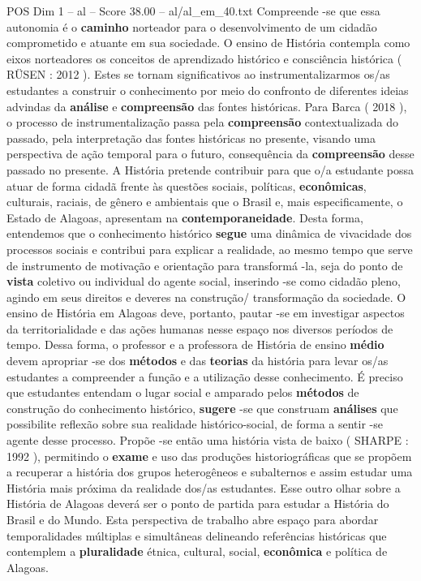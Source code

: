 \begin{textsample}{POS Dim 1 – al – Score 38.00 – al/al\_em\_40.txt}
Compreende -se que essa autonomia é o \textbf{caminho} norteador para o desenvolvimento de um cidadão comprometido e atuante em sua sociedade.
O ensino de História contempla como eixos norteadores os conceitos de aprendizado histórico e consciência histórica ( RÜSEN : 2012 ).
Estes se tornam significativos ao instrumentalizarmos os/as estudantes a construir o conhecimento por meio do confronto de diferentes ideias advindas da \textbf{análise} e \textbf{compreensão} das fontes históricas.
Para Barca ( 2018 ), o processo de instrumentalização passa pela \textbf{compreensão} contextualizada do passado, pela interpretação das fontes históricas no presente, visando uma perspectiva de ação temporal para o futuro, consequência da \textbf{compreensão} desse passado no presente.
A História pretende contribuir para que o/a estudante possa atuar de forma cidadã frente às questões sociais, políticas, \textbf{econômicas}, culturais, raciais, de gênero e ambientais que o Brasil e, mais especificamente, o Estado de Alagoas, apresentam na \textbf{contemporaneidade}.
Desta forma, entendemos que o conhecimento histórico \textbf{segue} uma dinâmica de vivacidade dos processos sociais e contribui para explicar a realidade, ao mesmo tempo que serve de instrumento de motivação e orientação para transformá -la, seja do ponto de \textbf{vista} coletivo ou individual do agente social, inserindo -se como cidadão pleno, agindo em seus direitos e deveres na construção/ transformação da sociedade.
O ensino de História em Alagoas deve, portanto, pautar -se em investigar aspectos da territorialidade e das ações humanas nesse espaço nos diversos períodos de tempo.
Dessa forma, o professor e a professora de História de ensino \textbf{médio} devem apropriar -se dos \textbf{métodos} e das \textbf{teorias} da história para levar os/as estudantes a compreender a função e a utilização desse conhecimento.
É preciso que estudantes entendam o lugar social e amparado pelos \textbf{métodos} de construção do conhecimento histórico, \textbf{sugere} -se que construam \textbf{análises} que possibilite reflexão sobre sua realidade histórico-social, de forma a sentir -se agente desse processo.
Propõe -se então uma história vista de baixo ( SHARPE : 1992 ), permitindo o \textbf{exame} e uso das produções historiográficas que se propõem a recuperar a história dos grupos heterogêneos e subalternos e assim estudar uma História mais próxima da realidade dos/as estudantes.
Esse outro olhar sobre a História de Alagoas deverá ser o ponto de partida para estudar a História do Brasil e do Mundo.
Esta perspectiva de trabalho abre espaço para abordar temporalidades múltiplas e simultâneas delineando referências históricas que contemplem a \textbf{pluralidade} étnica, cultural, social, \textbf{econômica} e política de Alagoas.

\end{textsample}
